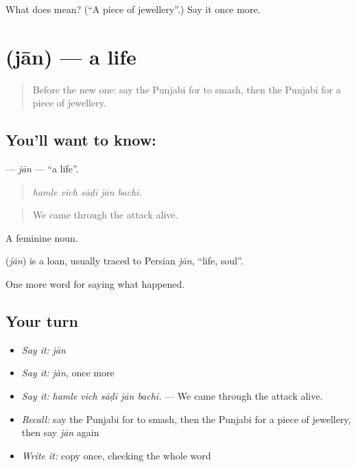 \begin{tcolorbox}[breakable,colback=teal!4,colframe=teal!35!black,title={Before you move on}]
What does  mean? (\textquotedblleft{}A piece of jewellery\textquotedblright{}.) Say it once more.
\end{tcolorbox}
\section[\texorpdfstring{\pa{ਜਾਨ} (jān)}{ਜਾਨ (jān)}]{ (jān) — a life}

\label{lesson:PA-C315-jan}



\begin{quote}
Before the new one: say the Punjabi for to smash, then the Punjabi for a piece of jewellery.
\end{quote}

\subsection*{You'll want to know: }
\textbf{} — \emph{jān} — \textquotedblleft{}a life\textquotedblright{}.

\begin{quote}
    
\end{quote}

\begin{quote}
\emph{hamle vich sāḍī jān bachī.}
\end{quote}

\begin{quote}
We came through the attack alive.
\end{quote}

A feminine noun.

\begin{cousinweb}
\textbf{} (\emph{jān}) is a loan, usually traced to Persian \emph{jān}, \textquotedblleft{}life, soul\textquotedblright{}.
\end{cousinweb}

\begin{grammarlens}[title={What you've built}]
One more word for saying what happened.
\end{grammarlens}

\subsection*{Your turn}
\begin{itemize}
\raggedright
  \item \emph{Say it:} \emph{jān}
  \item \emph{Say it:} \emph{jān}, once more
  \item \emph{Say it:} \emph{hamle vich sāḍī jān bachī.} — We came through the attack alive.
  \item \emph{Recall:} say the Punjabi for to smash, then the Punjabi for a piece of jewellery, then say \emph{jān} again
  \item \emph{Write it:} copy \textbf{} once, checking the whole word
\end{itemize}

